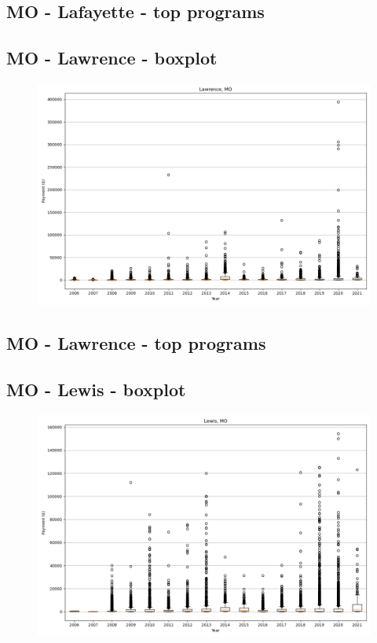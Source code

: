 \subsection*{MO - Lafayette - top programs}

\newpage
\subsection*{MO - Lawrence - boxplot}
\begin{figure}[h]
\centering
\includegraphics[width=7in]{../output/boxplots/counties/Lawrence-MO_boxplot.png}
\end{figure}


\subsection*{MO - Lawrence - top programs}

\newpage
\subsection*{MO - Lewis - boxplot}
\begin{figure}[h]
\centering
\includegraphics[width=7in]{../output/boxplots/counties/Lewis-MO_boxplot.png}
\end{figure}


